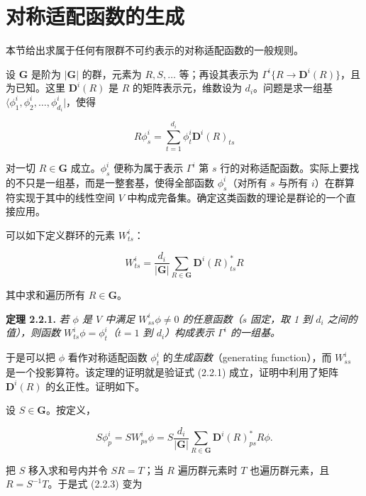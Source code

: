 \section{对称适配函数的生成}

本节给出求属于任何有限群不可约表示的对称适配函数的一般规则。

设 $\mathbf{G}$ 是阶为 $|\mathbf{G}|$ 的群，元素为 $R, S, \ldots$ 等；再设其表示为 $\Gamma^{i}\{R \rightarrow \mathbf{D}^{i}(R)\}$，且为已知。这里 $\mathbf{D}^{i}(R)$ 是 $R$ 的矩阵表示元，维数设为 $d_{i}$。问题是求一组基 $\langle \phi_{1}^{i}, \phi_{2}^{i}, \ldots, \phi_{d_{i}}^{i}|$，使得

\begin{equation*}
R\phi_{s}^{i} = \sum_{t=1}^{d_{i}} \phi_{t}^{i}\mathbf{D}^{i}(R)_{ts}
\tag{2.2.1}
\end{equation*}

对一切 $R \in \mathbf{G}$ 成立。$\phi_{s}^{i}$ 便称为属于表示 $\Gamma^{i}$ 第 $s$ 行的对称适配函数。实际上要找的不只是一组基，而是一整套基，使得全部函数 $\phi_{s}^{i}$（对所有 $s$ 与所有 $i$）在群算符实现于其中的线性空间 $V$ 中构成完备集。确定这类函数的理论是群论的一个直接应用。

可以如下定义群环的元素 $W_{ts}^{i}$：

\begin{equation*}
W_{ts}^{i} = \frac{d_{i}}{|\mathbf{G}|} \sum_{R \in \mathbf{G}} \mathbf{D}^{i}(R)_{ts}^{*} R
\tag{2.2.2}
\end{equation*}

其中求和遍历所有 $R \in \mathbf{G}$。

\textbf{定理 2.2.1.} \textit{若 $\phi$ 是 $V$ 中满足 $W_{ss}^{i}\phi \neq 0$ 的任意函数（$s$ 固定，取 1 到 $d_{i}$ 之间的值），则函数 $W_{ts}^{i}\phi = \phi_{t}^{i}$（$t = 1$ 到 $d_{i}$）构成表示 $\Gamma^{i}$ 的一组基。}

于是可以把 $\phi$ 看作对称适配函数 $\phi_{t}^{i}$ 的\textit{生成函数}（generating function），而 $W_{ss}^{i}$ 是一个投影算符。该定理的证明就是验证式 (2.2.1) 成立，证明中利用了矩阵 $\mathbf{D}^{i}(R)$ 的幺正性。证明如下。

设 $S \in \mathbf{G}$。按定义，

\begin{equation*}
S\phi_{p}^{i} = SW_{ps}^{i}\phi = S\frac{d_{i}}{|\mathbf{G}|} \sum_{R \in \mathbf{G}} \mathbf{D}^{i}(R)_{ps}^{*} R\phi.
\tag{2.2.3}
\end{equation*}

把 $S$ 移入求和号内并令 $SR = T$；当 $R$ 遍历群元素时 $T$ 也遍历群元素，且 $R = S^{-1}T$。于是式 (2.2.3) 变为

